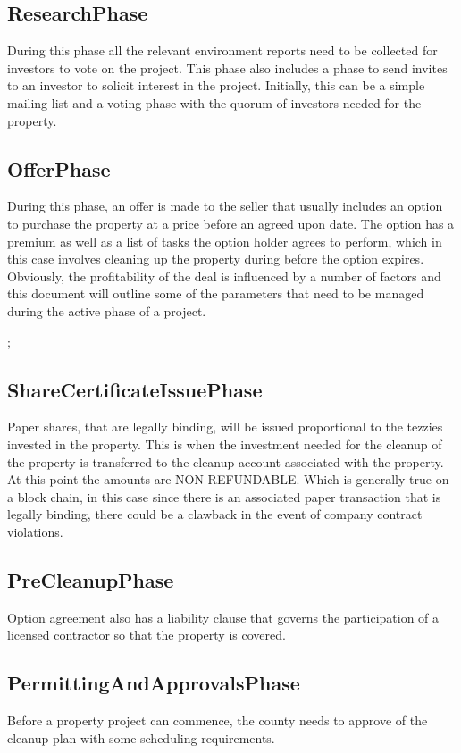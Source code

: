 \documentclass{article}
\begin{document}
\subsection{ResearchPhase}

  During this phase all the relevant environment reports need to be collected for investors to vote on the project. This phase also includes a phase to send invites to an investor to solicit interest in the project. Initially, 
  this can be a simple mailing list and a voting phase with the quorum of investors needed for the property.

\subsection{OfferPhase}

  During this phase, an offer is made to the seller that usually includes an option to purchase the property at a price before an agreed upon date. The option has a premium as well as a list of tasks the option holder agrees to perform, which in this case involves cleaning up the property during before the option expires. Obviously, the profitability of the deal is influenced by a number of factors and this document will outline some of the parameters that need to be managed during the active phase of a project.

;  \subsection{ShareCertificateIssuePhase}

  Paper shares, that are legally binding, will be issued proportional to the tezzies invested 
  in the property. This is when the investment needed for the cleanup of the property is transferred to the cleanup account associated with the property. At this point the amounts are NON-REFUNDABLE. Which is generally true on a block chain, in this case since there is an associated paper transaction that is legally binding, there could be a clawback in the event of company contract violations.

  \subsection{PreCleanupPhase}
  Option agreement also has a liability clause that governs the participation of a licensed contractor so that the property is covered. 

  \subsection{PermittingAndApprovalsPhase}
  Before a property project can commence, the county needs to approve of the cleanup plan with some scheduling requirements. 
\end{document}
